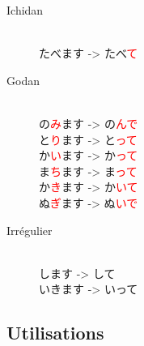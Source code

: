 \documentclass[11pt]{report}
\newenvironment{Japanese}{%
\CJKfamily{min}%
\CJKtilde  
\CJKnospace}{}
\begin{document}
\begin{CJK}{UTF8}{}  
\begin{Japanese}
	\begin{description}
		\item[Ichidan] \hfill \\
			たべます -> たべ\textcolor{red}{て}
		\item[Godan] \hfill \\
			の\textcolor{red}{み}ます -> の\textcolor{red}{んで} \\
			と\textcolor{red}{り}ます -> と\textcolor{red}{って} \\
			か\textcolor{red}{い}ます -> か\textcolor{red}{って} \\
			ま\textcolor{red}{ち}ます -> ま\textcolor{red}{って} \\
			か\textcolor{red}{き}ます -> か\textcolor{red}{いて} \\
			ぬ\textcolor{red}{ぎ}ます -> ぬ\textcolor{red}{いで}
		\item[Irrégulier] \hfill \\
			します -> して \\
			いきます -> いって
	\end{description}
\end{Japanese}  
\end{CJK}

\subsection{Utilisations}
\end{document}

